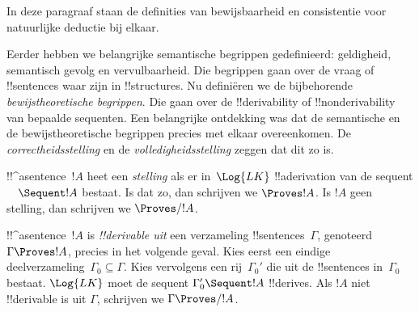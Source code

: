 \documentclass[../../../include/open-logic-section]{subfiles}
\begin{document}
\begin{editorial}
  In deze paragraaf staan de definities van bewijsbaarheid en
  consistentie voor natuurlijke deductie bij elkaar.
\end{editorial}

      {}
      {}


\begin{explain}
Eerder hebben we belangrijke semantische begrippen gedefinieerd:
geldigheid, semantisch gevolg en vervulbaarheid. Die begrippen gaan
over de vraag of !!{sentence}s waar zijn in !!{structure}s. Nu
definiëren we de bijbehorende \emph{bewijstheoretische begrippen}. Die
gaan over de !!{derivability} of !!{nonderivability} van bepaalde
sequenten. Een belangrijke ontdekking was dat de semantische en de
bewijstheoretische begrippen precies met elkaar overeenkomen. De
\emph{correctheidsstelling} en de \emph{volledigheidsstelling} zeggen
dat dit zo is.
\end{explain}

\begin{defn}[Stellingen]
!!^a{sentence}~$!A$ heet een \emph{stelling} als er in~$\Log{LK}$
!!a{derivation} van de sequent $\quad \Sequent !A$ bestaat. Is dat zo,
dan schrijven we $\Proves !A$. Is $!A$ geen stelling, dan schrijven we
$\Proves/ !A$.
\end{defn}

\begin{defn}[!!^{derivability}]
!!^a{sentence}~$!A$ is \emph{!!{derivable} uit} een verzameling
!!{sentence}s~$\Gamma$, genoteerd $\Gamma \Proves !A$, precies in het
volgende geval. Kies eerst een eindige deelverzameling~$\Gamma_0
\subseteq \Gamma$. Kies vervolgens een rij~$\Gamma_0'$ die uit de
!!{sentence}s in~$\Gamma_0$ bestaat. $\Log{LK}$ moet de sequent
$\Gamma_0' \Sequent !A$ !!{derive}s. Als $!A$ niet !!{derivable} is uit $\Gamma$, schrijven
we $\Gamma \Proves/ !A$.
\end{defn}
\end{document}
